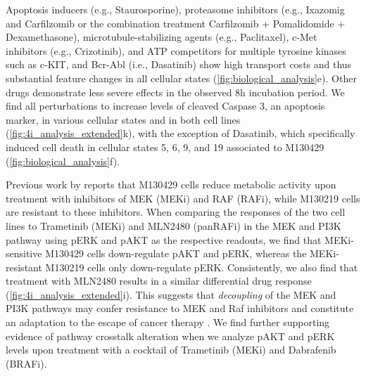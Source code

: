Apoptosis inducers (e.g., Staurosporine), proteasome inhibitors (e.g., Ixazomig and Carfilzomib or the combination treatment Carfilzomib + Pomalidomide + Dexamethasone), microtubule-stabilizing agents (e.g., Paclitaxel), c-Met inhibitors (e.g., Crizotinib), and ATP competitors for multiple tyrosine kinases such as c-KIT, and Bcr-Abl (i.e., Dasatinib) show high transport costs and thus substantial feature changes in all cellular states (\cref{fig:biological_analysis}e). Other drugs demonstrate less severe effects in the observed 8h incubation period. 
We find all perturbations to increase levels of cleaved Caspase 3, an apoptosis marker, in various cellular states and in both cell lines (\cref{fig:4i_analysis_extended}k), with the exception of Dasatinib, which specifically induced cell death in cellular states 5, 6, 9, and 19 associated to M130429 (\cref{fig:biological_analysis}f).


 Previous work by \citet{smith2016inhibiting} reports that M130429 cells reduce metabolic activity %
upon treatment with inhibitors of MEK (MEKi) and RAF (RAFi), while M130219 cells are resistant to these inhibitors. When comparing the responses of the two cell lines to Trametinib (MEKi) and MLN2480 (panRAFi) in the MEK and PI3K pathway using pERK and pAKT as the respective readouts, we find that MEKi-sensitive M130429 cells down-regulate pAKT and pERK, whereas the MEKi-resistant M130219 cells only down-regulate pERK. Consistently, we also find that treatment with MLN2480 results in a similar differential drug response (\cref{fig:4i_analysis_extended}i). This suggests that \textit{decoupling} of the MEK and PI3K pathways may confer resistance to MEK and Raf inhibitors and constitute an adaptation to the escape of cancer therapy \citep{kun2021mek}. We find further supporting evidence of pathway crosstalk alteration when we analyze pAKT and pERK levels upon treatment with a cocktail of Trametinib (MEKi) and Dabrafenib (BRAFi). 

